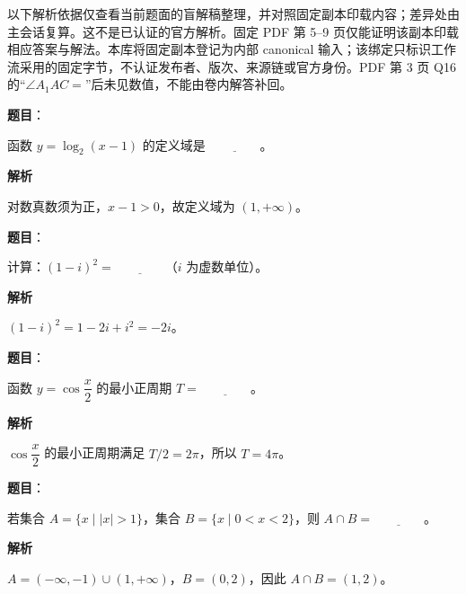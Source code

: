 

\begin{gktip}
以下解析依据仅查看当前题面的盲解稿整理，并对照固定副本印载内容；差异处由主会话复算。这不是已认证的官方解析。固定 PDF 第 5–9 页仅能证明该副本印载相应答案与解法。本库将固定副本登记为内部 canonical 输入；该绑定只标识工作流采用的固定字节，不认证发布者、版次、来源链或官方身份。PDF 第 3 页 Q16 的“$\angle A_1AC=$”后未见数值，不能由卷内解答补回。
\end{gktip}

\begin{answer}

\textbf{题目}：

函数 $y=\log_2(x-1)$ 的定义域是 $\underline{\qquad\qquad}$。

\textbf{解析}

对数真数须为正，$x-1>0$，故定义域为 $(1,+\infty)$。


\end{answer}
\begin{answer}

\textbf{题目}：

计算：$(1-i)^2=\underline{\qquad\qquad}$（$i$ 为虚数单位）。

\textbf{解析}

$(1-i)^2=1-2i+i^2=-2i$。


\end{answer}
\begin{answer}

\textbf{题目}：

函数 $y=\cos\dfrac{x}{2}$ 的最小正周期 $T=\underline{\qquad\qquad}$。

\textbf{解析}

$\cos\dfrac{x}{2}$ 的最小正周期满足 $T/2=2\pi$，所以 $T=4\pi$。


\end{answer}
\begin{answer}

\textbf{题目}：

若集合 $A=\{x\mid |x|>1\}$，集合 $B=\{x\mid 0<x<2\}$，则 $A\cap B=\underline{\qquad\qquad}$。

\textbf{解析}

$A=(-\infty,-1)\cup(1,+\infty)$，$B=(0,2)$，因此 $A\cap B=(1,2)$。


\end{answer}
